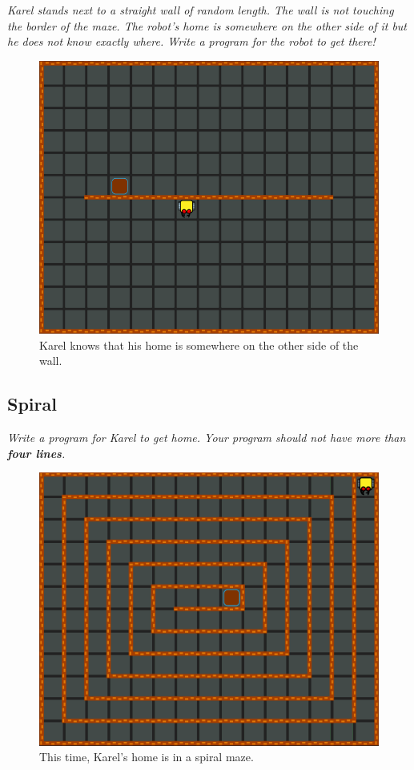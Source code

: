 {{{\em Karel stands next to a straight wall of random length. The wall is not touching the border of the maze. The robot's home is somewhere on the other side of it but he does not know exactly where. Write a program for the robot to get there!}

\begin{figure}[!ht]
\begin{center}
\includegraphics[height=0.4\textwidth]{img/e03.png}
\end{center}
\vspace{-4mm}
\caption{Karel knows that his home is somewhere on the other side of the wall.}
\label{fig:e03}
\end{figure}

\newpage

\subsection{Spiral}

{\em Write a program for Karel to get home. Your program should not have more than {\bf four lines}.}

\begin{figure}[!ht]
\begin{center}
\includegraphics[height=0.4\textwidth]{img/e04.png}
\end{center}
\vspace{-4mm}
\caption{This time, Karel's home is in a spiral maze.}
\label{fig:e04}
\end{figure}



}}
